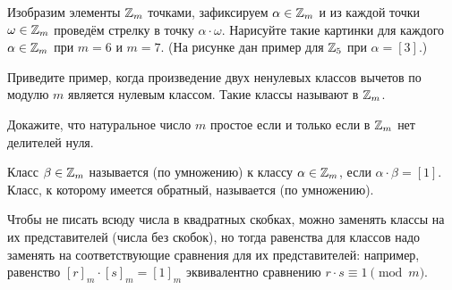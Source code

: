 \documentclass[a4paper, 12pt]{article}
\begin{document}
Изобразим элементы $\mathbb{Z}_m$ точками, зафиксируем %
$\alpha\in\mathbb{Z}_m$ и из каждой точки $\omega\in\mathbb{Z}_m$ провед\"ем стрелку в точку $\alpha\cdot \omega$.
Нарисуйте такие картинки для каждого $\alpha\in\mathbb{Z}_m$ при $m=6$ и $m=7$. (На рисунке дан пример для $\mathbb{Z}_5$ при $\alpha=[3]$.)









 Приведите пример, когда произведение двух ненулевых классов
вычетов по модулю $m$ является нулевым классом. Такие классы
называют  в $\mathbb{Z}_m$. 

 Докажите, что натуральное число $m$ простое если и только если
в $\mathbb{Z}_m$ нет делителей нуля. 

 Класс $\beta\in\mathbb{Z}_m$ называется   (по умножению) к классу $\alpha\in\mathbb{Z}_m$, если $\alpha\cdot \beta = [1]$.
Класс, к которому имеется обратный, называется  (по умножению).

{\small
{} Чтобы не писать всюду числа в квадратных скобках, можно заменять классы на их представителей (числа без скобок), но тогда равенства для классов надо заменять на соответствующие сравнения для их представителей: например, равенство $[r]_m\cdot[s]_m = [1]_m$ эквивалентно сравнению $r\cdot s \equiv 1\!\pmod{m}$.
}
\end{document}
